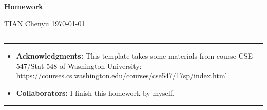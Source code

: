 \documentclass[a4paper]{article}
\begin{document}
\courseheader



\setcounter{hwcnt}{1} %

\begin{center}
  \underline{\bf Homework \thehwcnt} \\
\end{center}
\begin{flushleft}
  TIAN Chenyu\hfill
  \today
\end{flushleft}
\hrule

\vspace{2em}

\flushleft
\rule{\textwidth}{1pt}
\begin{itemize}
\item {\bf Acknowledgments: \/} 
  This template takes some materials from course CSE 547/Stat 548 of Washington University: \small{\url{https://courses.cs.washington.edu/courses/cse547/17sp/index.html}}.
\item {\bf Collaborators: \/}
  I finish this homework by myself.
\end{itemize}
\rule{\textwidth}{1pt}

\vspace{2em}

\end{document}
